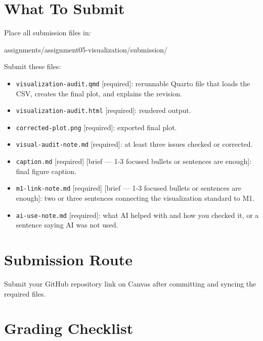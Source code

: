 \documentclass[
  letterpaper,
  DIV=11,
  numbers=noendperiod,
  oneside]{scrreprt}
\newenvironment{Shaded}{\begin{snugshade}}{\end{snugshade}}
\newcommand{\NormalTok}[1]{\textcolor[rgb]{0.00,0.23,0.31}{#1}}
\providecommand{\tightlist}{%
  \setlength{\itemsep}{0pt}\setlength{\parskip}{0pt}}
\begin{document}
\section{What To Submit}\label{what-to-submit-4}

Place all submission files in:

\begin{Shaded}
\begin{Highlighting}[numbers=left,,]
\NormalTok{assignments/assignment05{-}visualization/submission/}
\end{Highlighting}
\end{Shaded}

Submit these files:

\begin{itemize}
\tightlist
\item
  \texttt{visualization-audit.qmd} {[}required{]}: rerunnable Quarto
  file that loads the CSV, creates the final plot, and explains the
  revision.
\item
  \texttt{visualization-audit.html} {[}required{]}: rendered output.
\item
  \texttt{corrected-plot.png} {[}required{]}: exported final plot.
\item
  \texttt{visual-audit-note.md} {[}required{]}: at least three issues
  checked or corrected.
\item
  \texttt{caption.md} {[}required{]} {[}brief --- 1-3 focused bullets or
  sentences are enough{]}: final figure caption.
\item
  \texttt{m1-link-note.md} {[}required{]} {[}brief --- 1-3 focused
  bullets or sentences are enough{]}: two or three sentences connecting
  the visualization standard to M1.
\item
  \texttt{ai-use-note.md} {[}required{]}: what AI helped with and how
  you checked it, or a sentence saying AI was not used.
\end{itemize}

\section{Submission Route}\label{submission-route-4}

Submit your GitHub repository link on Canvas after committing and
syncing the required files.

\section{Grading Checklist}\label{grading-checklist-4}
\end{document}
